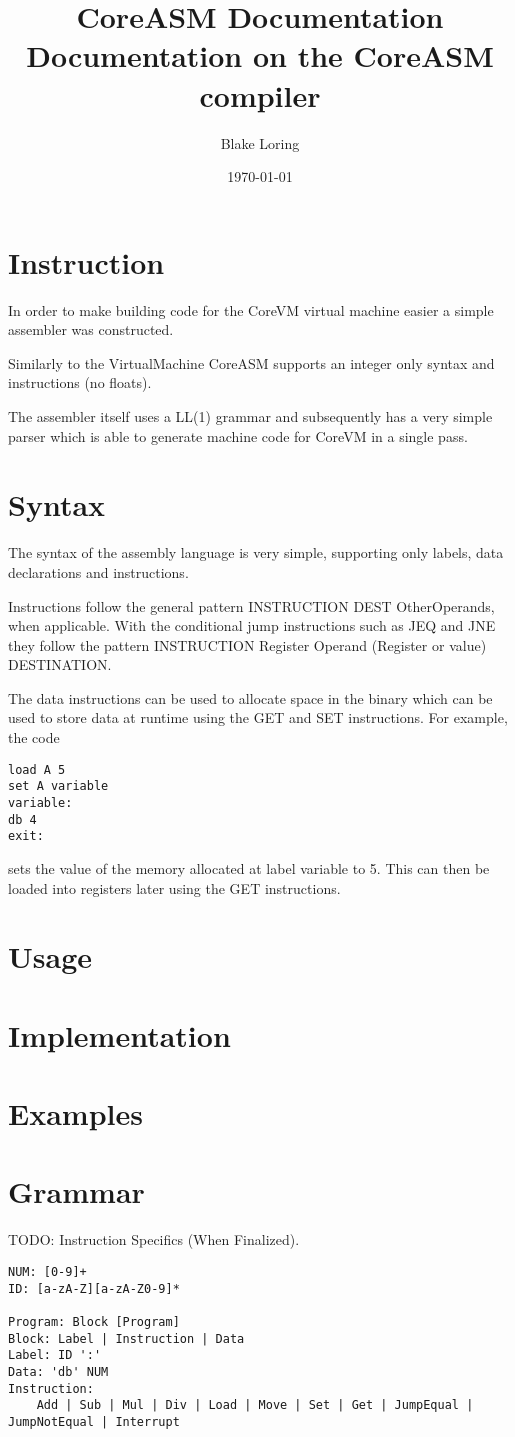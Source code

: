 \documentclass{article}
\title{CoreASM Documentation \\ \large Documentation on the CoreASM compiler}
\author{Blake Loring}
\date{\today}
\begin{document}
\maketitle

\section* {Instruction}

In order to make building code for the CoreVM virtual machine easier a simple assembler was constructed.

Similarly to the VirtualMachine CoreASM supports an integer only syntax and instructions (no floats).

The assembler itself uses a LL(1) grammar and subsequently has a very simple parser which is able to generate machine code for CoreVM in a single pass. 

\section* {Syntax}

The syntax of the assembly language is very simple, supporting only labels, data declarations and instructions.

Instructions follow the general pattern INSTRUCTION DEST OtherOperands, when applicable. With the conditional jump instructions
such as JEQ and JNE they follow the pattern INSTRUCTION Register Operand (Register or value) DESTINATION.

The data instructions can be used to allocate space in the binary which can be used to store data at runtime using the GET and SET instructions.
For example, the code
\begin {verbatim}
load A 5
set A variable
variable:
db 4
exit:
\end{verbatim}
sets the value of the memory allocated at label variable to 5. This can then be loaded into registers later using the GET instructions.

\section* {Usage}

\section* {Implementation}
\section* {Examples}
\section* {Grammar}

TODO: Instruction Specifics (When Finalized).

\begin{verbatim}
NUM: [0-9]+
ID: [a-zA-Z][a-zA-Z0-9]*

Program: Block [Program]
Block: Label | Instruction | Data
Label: ID ':'
Data: 'db' NUM
Instruction:
	Add | Sub | Mul | Div | Load | Move | Set | Get | JumpEqual | JumpNotEqual | Interrupt
\end{verbatim}
\end{document}
